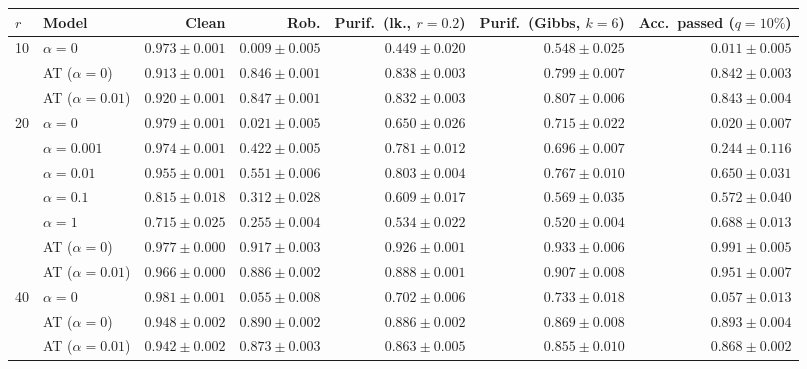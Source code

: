\begin{tabular}{@{}llrrrrr@{}}
\toprule
$r$ & Model & Clean & Rob. & Purif.\ (lk., $r{=}0.2$) & Purif.\ (Gibbs, $k{=}6$) & Acc.\ passed ($q{=}10\%$) \\
\midrule
\multirow{3}{*}{10} & $\alpha{=}0$ & $0.973 \pm 0.001$ & $0.009 \pm 0.005$ & $0.449 \pm 0.020$ & $0.548 \pm 0.025$ & $0.011 \pm 0.005$ \\
 & AT ($\alpha{=}0$) & $0.913 \pm 0.001$ & $0.846 \pm 0.001$ & $0.838 \pm 0.003$ & $0.799 \pm 0.007$ & $0.842 \pm 0.003$ \\
 & AT ($\alpha{=}0.01$) & $0.920 \pm 0.001$ & $0.847 \pm 0.001$ & $0.832 \pm 0.003$ & $0.807 \pm 0.006$ & $0.843 \pm 0.004$ \\
\cmidrule(lr){1-7}
\multirow{7}{*}{20} & $\alpha{=}0$ & $0.979 \pm 0.001$ & $0.021 \pm 0.005$ & $0.650 \pm 0.026$ & $0.715 \pm 0.022$ & $0.020 \pm 0.007$ \\
 & $\alpha{=}0.001$ & $0.974 \pm 0.001$ & $0.422 \pm 0.005$ & $0.781 \pm 0.012$ & $0.696 \pm 0.007$ & $0.244 \pm 0.116$ \\
 & $\alpha{=}0.01$ & $0.955 \pm 0.001$ & $0.551 \pm 0.006$ & $0.803 \pm 0.004$ & $0.767 \pm 0.010$ & $0.650 \pm 0.031$ \\
 & $\alpha{=}0.1$ & $0.815 \pm 0.018$ & $0.312 \pm 0.028$ & $0.609 \pm 0.017$ & $0.569 \pm 0.035$ & $0.572 \pm 0.040$ \\
 & $\alpha{=}1$ & $0.715 \pm 0.025$ & $0.255 \pm 0.004$ & $0.534 \pm 0.022$ & $0.520 \pm 0.004$ & $0.688 \pm 0.013$ \\
 & AT ($\alpha{=}0$) & $0.977 \pm 0.000$ & $\mathbf{0.917 \pm 0.003}$ & $\mathbf{0.926 \pm 0.001}$ & $\mathbf{0.933 \pm 0.006}$ & $\mathbf{0.991 \pm 0.005}$ \\
 & AT ($\alpha{=}0.01$) & $0.966 \pm 0.000$ & $0.886 \pm 0.002$ & $0.888 \pm 0.001$ & $0.907 \pm 0.008$ & $0.951 \pm 0.007$ \\
\cmidrule(lr){1-7}
\multirow{3}{*}{40} & $\alpha{=}0$ & $\mathbf{0.981 \pm 0.001}$ & $0.055 \pm 0.008$ & $0.702 \pm 0.006$ & $0.733 \pm 0.018$ & $0.057 \pm 0.013$ \\
 & AT ($\alpha{=}0$) & $0.948 \pm 0.002$ & $0.890 \pm 0.002$ & $0.886 \pm 0.002$ & $0.869 \pm 0.008$ & $0.893 \pm 0.004$ \\
 & AT ($\alpha{=}0.01$) & $0.942 \pm 0.002$ & $0.873 \pm 0.003$ & $0.863 \pm 0.005$ & $0.855 \pm 0.010$ & $0.868 \pm 0.002$ \\
\bottomrule
\end{tabular}
